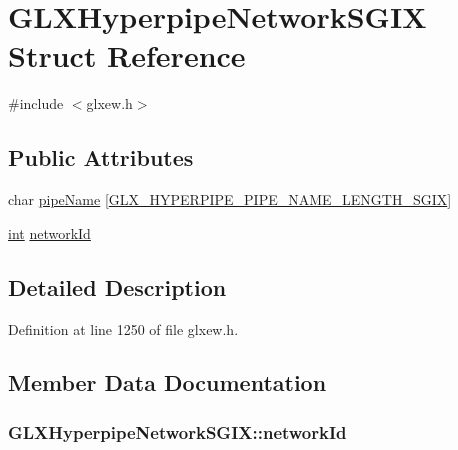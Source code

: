 \hypertarget{struct_g_l_x_hyperpipe_network_s_g_i_x}{}\section{G\+L\+X\+Hyperpipe\+Network\+S\+G\+I\+X Struct Reference}
\label{struct_g_l_x_hyperpipe_network_s_g_i_x}


{\ttfamily \#include $<$glxew.\+h$>$}

\subsection*{Public Attributes}
\begin{DoxyCompactItemize}
\item 
char \hyperlink{struct_g_l_x_hyperpipe_network_s_g_i_x_a6338b9717fa895aec16b932f2ef693ed}{pipe\+Name} \mbox{[}\hyperlink{glxew_8h_ae1c8261c0861010d8003a31d07e26005}{G\+L\+X\+\_\+\+H\+Y\+P\+E\+R\+P\+I\+P\+E\+\_\+\+P\+I\+P\+E\+\_\+\+N\+A\+M\+E\+\_\+\+L\+E\+N\+G\+T\+H\+\_\+\+S\+G\+I\+X}\mbox{]}
\item 
\hyperlink{wglew_8h_a500a82aecba06f4550f6849b8099ca21}{int} \hyperlink{struct_g_l_x_hyperpipe_network_s_g_i_x_a81393053988b32fadb0b21615024add1}{network\+Id}
\end{DoxyCompactItemize}


\subsection{Detailed Description}


Definition at line 1250 of file glxew.\+h.



\subsection{Member Data Documentation}
\hypertarget{struct_g_l_x_hyperpipe_network_s_g_i_x_a81393053988b32fadb0b21615024add1}{}
\subsubsection[{network\+Id}]{ G\+L\+X\+Hyperpipe\+Network\+S\+G\+I\+X\+::network\+Id}\label{struct_g_l_x_hyperpipe_network_s_g_i_x_a81393053988b32fadb0b21615024add1}



